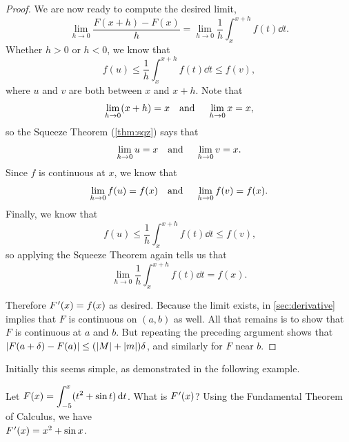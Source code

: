 \begin{proof}
We are now ready to compute the desired limit,
\[\lim_{h\to 0}\frac{F(x+h)-F(x)}{h}=\lim_{h\to 0}\frac1h\int_x^{x+h} f(t)\dd t.\]
Whether $h>0$ or $h<0$, we know that
\[f(u)\leq \frac1h\int_x^{x+h} f(t)\dd t\leq f(v),\]
where $u$ and $v$ are both between $x$ and $x+h$. Note that 
\[\lim_{h\to 0} (x+h)=x \text{\quad and \quad} \lim_{h\to 0} x=x,\]
so the Squeeze Theorem (\autoref{thm:sqz}) says that
\[\lim_{h\to 0}u=x \text{\quad and \quad} \lim_{h\to 0} v=x.\]
Since $f$ is continuous at $x$, we know that
\[\lim_{h\to 0} f(u)=f(x)\text{\quad and \quad} \lim_{h\to 0}f(v)=f(x).\]
Finally, we know that
\[f(u)\leq \frac1h \int_x^{x+h} f(t)\dd t\leq f(v)\text{,}\]
so applying the Squeeze Theorem again tells us that
\[\lim_{h\to 0}\frac1h\int_x^{x+h} f(t)\dd t=f(x).\] 

Therefore $\Fp(x)=f(x)$ as desired.  Because the limit exists,  in \autoref{sec:derivative} implies that $F$ is continuous on $(a,b)$ as well. All that remains is to show that $F$ is continuous at $a$ and $b$.  But repeating the preceding argument shows that $\left\lvert F(a+\delta)-F(a) \right\rvert\le(\left\lvert M \right\rvert+\left\lvert m \right\rvert)\delta$, and similarly for $F$ near $b$.%
\end{proof}


Initially this seems simple, as demonstrated in the following example.

\begin{example}\label{ex_ftc2}%
Let $\displaystyle F(x) = \int_{-5}^x (t^2+\sin t)\operatorname{d}\! t$. What is $\Fp(x)$?
\solution
Using the Fundamental Theorem of Calculus, we have\\
$\Fp(x) = x^2+\sin x$.
\end{example}

